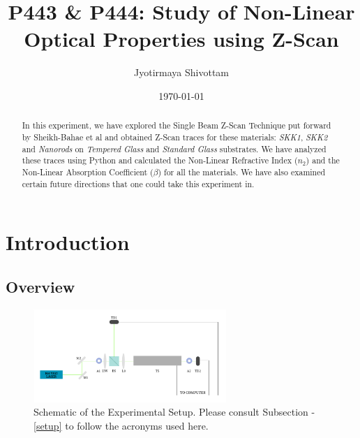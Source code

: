 \documentclass[%
 reprint,
amsmath,
amssymb,
10pt
]{revtex4-2}
\begin{document}

\title{P443 \& P444: Study of Non-Linear Optical Properties using Z-Scan}%

\author{Jyotirmaya Shivottam}
%

\date{\today}

\begin{abstract}
In this experiment, we have explored the Single Beam Z-Scan Technique put forward by Sheikh-Bahae et al \cite{bahae} and obtained Z-Scan traces for these materials: \textit{SKK1}, \textit{SKK2} and \textit{Nanorods} on \textit{Tempered Glass} and \textit{Standard Glass} substrates. We have analyzed these traces using Python and calculated the Non-Linear Refractive Index ($n_2$) and the Non-Linear Absorption Coefficient ($\beta$) for all the materials. We have also examined certain future directions that one could take this experiment in.
\end{abstract}


\maketitle

\tableofcontents

\section{\label{intro}Introduction}
\subsection{\label{overview}Overview}
\begin{figure}
    \centering
    \includegraphics[width=0.65\textwidth]{images/schem.png}
    \caption{Schematic of the Experimental Setup. Please consult Subsection - \ref{setup} to follow the acronyms used here.}
    \label{fig:schem}
\end{figure}
\end{document}
